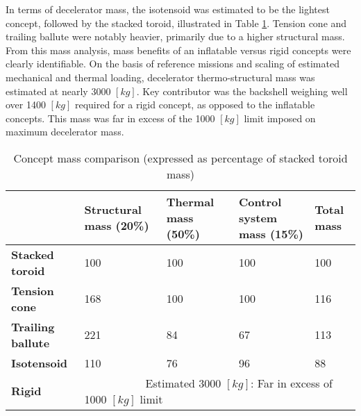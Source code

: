 In terms of decelerator mass, the isotensoid was estimated to be the lightest concept, followed by the stacked toroid, illustrated in Table \ref{tab:cmass}. Tension cone and trailing ballute were notably heavier, primarily due to a higher structural mass. From this mass analysis, mass benefits of an inflatable versus rigid concepts were clearly identifiable. On the basis of reference missions and scaling of estimated mechanical and thermal loading, decelerator thermo-structural mass was estimated at nearly 3000 $[kg]$. Key contributor was the backshell weighing well over 1400 $[kg]$ required for a rigid concept, as opposed to the inflatable concepts. This mass was far in excess of the 1000 $[kg]$ limit imposed on maximum decelerator mass.

\begin{table}
\centering
\caption[Concept mass comparison]{Concept mass comparison (expressed as percentage of stacked toroid mass)}\label{tab:cmass}
\begin{tabular}{|p{}|p{}|p{}|p{}||p{}|}

\hline
                          & \textbf{Structural mass (20\%)} & \textbf{Thermal mass (50\%)} & \textbf{Control system mass (15\%)} & \textbf{Total mass} \\ \hline
\textbf{Stacked toroid}   &  100                                 & 100                          & 100                                      &\cellcolor{green!70}  100                           \\ \hline
\textbf{Tension cone}     &  168                               & 100                               &  100                                     &\cellcolor{yellow!70} 116                                 \\ \hline
\textbf{Trailing ballute} &  221                                 & 84                               & 67                                      &\cellcolor{yellow!70} 113 \\ \hline
\textbf{Isotensoid}       &  110                                 & 76                               & 96                                      &\cellcolor{green!70} 88 \\ \hline \hline
\textbf{Rigid}            &  \multicolumn{4}{|p{0.762\textwidth}|}{\cellcolor{red!60} ~~~~~~~~~~~Estimated 3000 $[kg]$: Far in excess of 1000 $[kg]$ limit}    \\ \hline
\end{tabular}
\end{table}




